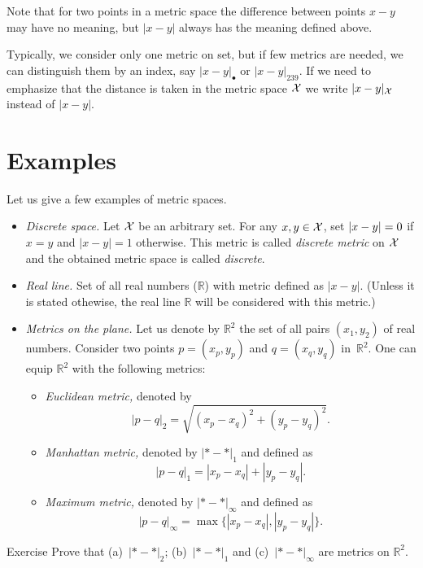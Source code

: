 Note that for two points in a metric space  the difference between points $x-y$ may have no meaning,
but $|x-y|$ always has the meaning defined above.

Typically, we consider only one metric on set, 
but if few metrics are needed, we can distinguish them by an index, say  $|x-y|_{\bullet}$ or $|x-y|_{239}$.
If we need to emphasize that the distance is taken in the metric space $\mathcal{X}$ we write $|x-y|_{\mathcal X}$ instead of $|x-y|$.

\section{Examples}\label{sec:examples(metric-spaces)}

Let us give a few examples of metric spaces.

\begin{itemize}
\item\emph{Discrete space.}\label{page:Discrete metric} Let $\mathcal X$ be an arbitrary set. 
For any $x,y\z\in\c X$, 
set $|x-y|\z=0$ if $x=y$ and $|x-y|=1$ otherwise.
This metric is called \emph{discrete metric} on $\mathcal X$ and the obtained metric space is called \emph{discrete}.
\item{}\emph{Real line.} 
Set of all real numbers ($\mathbb{R}$) with metric defined as 
$|x-y|$. 
(Unless it is stated othewise, the real line $\mathbb{R}$ will be considered with this metric.) 
\item {}\emph{Metrics on the plane.}\label{page:Metrics on the plane}
Let us denote by $\mathbb{R}^2$ the set of all pairs $(x_1,y_2)$ of real numbers.
Consider two points $p=(x_p,y_p)$ and $q=(x_q,y_q)$  in~$\mathbb{R}^2$.
One can equip $\mathbb{R}^2$ with the following metrics:
\begin{itemize}
\item{}\emph{Euclidean metric,} denoted by 
$$|p-q|_2=\sqrt{(x_p-x_q)^2+(y_p-y_q)^2}.$$
\item\label{Manhattan plane}\emph{Manhattan metric,} denoted by $|{*}-{*}|_1$ and defined as 
$$|p-q|_1=|x_p-x_q|+|y_p-y_q|.$$
\item{}\emph{Maximum metric,} denoted by $|{*}-{*}|_\infty$ and defined as 
$$|p-q|_\infty=\max\{|x_p-x_q|,|y_p-y_q|\}.$$
\end{itemize}
\end{itemize}

\begin{thm}{Exercise}\label{ex:d1+d2+dinfty}
Prove that (a)~$|{*}-{*}|_2$; (b)~$|{*}-{*}|_1$ and (c)~$|{*}-{*}|_\infty$ are metrics on $\mathbb{R}^2$.
\end{thm}

